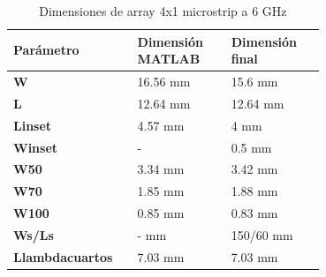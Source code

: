 \begin{table}[H]
  

   \small %
   \centering %
   \begin{tabular}{m{0.2\linewidth}m{0.25\linewidth}m{0.25\linewidth}} %
   \toprule[\heavyrulewidth]\toprule[\heavyrulewidth]
   \textbf{Parámetro} & \textbf{Dimensión MATLAB} & \textbf{Dimensión final} \\ 
   \midrule
   \textbf{W} & 16.56 mm & 15.6 mm \\
   \textbf{L} & 12.64 mm & 12.64 mm\\
   \textbf{Linset} & 4.57 mm & 4 mm\\
   \textbf{Winset} & - & 0.5 mm\\
   \textbf{W50} & 3.34 mm & 3.42 mm\\
   \textbf{W70} & 1.85 mm & 1.88 mm\\
   \textbf{W100} & 0.85 mm & 0.83 mm\\
   \textbf{Ws/Ls} & - mm & 150/60 mm\\
   \textbf{Llambdacuartos} & 7.03 mm & 7.03 mm\\
   \bottomrule[\heavyrulewidth] 
   \end{tabular}
   \caption{Dimensiones de array 4x1 microstrip a 6 GHz} 
      \label{tab:array4x12}
\end{table}






